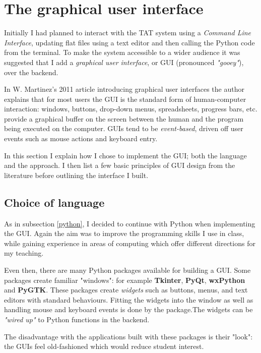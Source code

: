 \documentclass[10pt]{article}
\begin{document}
\section{The graphical user interface} \label{gui}

Initially I had planned to interact with the TAT system using a \emph{Command Line Interface}, updating flat files using a text editor and then calling the Python code from the terminal. To make the system accessible to a wider audience it was suggested that I add a \emph{graphical user interface}, or GUI (pronounced \emph{"gooey"}), over the backend.

In W. Martinez's 2011 article \cite{Mart11} introducing graphical user interfaces the author explains that for most users the GUI is the standard form of human-computer interaction: windows, buttons, drop-down menus, spreadsheets, progress bars, etc. provide a graphical buffer on the screen between the human and the program being executed on the computer. GUIs tend to be \emph{event-based}, driven off user events such as mouse actions and keyboard entry.

In this section I explain how I chose to implement the GUI; both the language and the approach. I then list a few basic principles of GUI design from the literature before outlining the interface I built.

\subsection{Choice of language}

As in subsection \ref{python}, I decided to continue with Python when implementing the GUI. Again the aim was to improve the programming skills I use in class, while gaining experience in areas of computing which offer different directions for my teaching.

Even then, there are many Python packages available for building a GUI. Some packages create familiar "windows": for example \textbf{Tkinter}, \textbf{PyQt}, \textbf{wxPython} and \textbf{PyGTK}. These packages create \emph{widgets} such as buttons, menus, and text editors with standard behaviours. Fitting the widgets into the window as well as handling mouse and keyboard events is done by the package.The widgets can be \emph{"wired up"} to Python functions in the backend. 

The disadvantage with the applications built with these packages is their "look": the GUIs feel old-fashioned which would reduce student interest.
\end{document}
